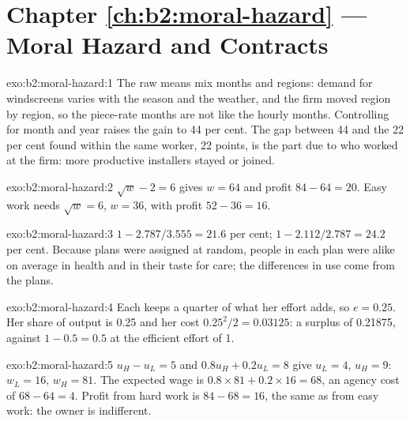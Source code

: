 \section*{Chapter \ref{ch:b2:moral-hazard} --- Moral Hazard and Contracts}

\begin{solution}{exo:b2:moral-hazard:1}
The raw means mix months and regions: demand for windscreens varies with the season and the weather, and the firm moved
region by region, so the piece-rate months are not like the hourly months. Controlling for month and year raises the
gain to 44 per cent. The gap between 44 and the 22 per cent found within the same worker, 22 points, is the part due to
who worked at the firm: more productive installers stayed or joined.
\end{solution}

\begin{solution}{exo:b2:moral-hazard:2}
$\sqrt{w} - 2 = 6$ gives $w = 64$ and profit $84 - 64 = 20$. Easy work needs $\sqrt{w} = 6$, $w = 36$, with profit $52 - 36 = 16$.
\end{solution}

\begin{solution}{exo:b2:moral-hazard:3}
$1 - 2.787/3.555 = 21.6$ per cent; $1 - 2.112/2.787 = 24.2$ per cent. Because plans were assigned at random, people in each plan
were alike on average in health and in their taste for care; the differences in use come from the plans.
\end{solution}

\begin{solution}{exo:b2:moral-hazard:4}
Each keeps a quarter of what her effort adds, so $e = 0.25$. Her share of output is 0.25 and her cost $0.25^2/2 = 0.03125$: a surplus
of 0.21875, against $1 - 0.5 = 0.5$ at the efficient effort of 1.
\end{solution}

\begin{solution}{exo:b2:moral-hazard:5}
$u_H - u_L = 5$ and $0.8u_H + 0.2u_L = 8$ give $u_L = 4$, $u_H = 9$: $w_L = 16$, $w_H = 81$. The expected wage is $0.8 \times 81 + 0.2 \times 16 = 68$, an
agency cost of $68 - 64 = 4$. Profit from hard work is $84 - 68 = 16$, the same as from easy work: the owner is indifferent.
\end{solution}

